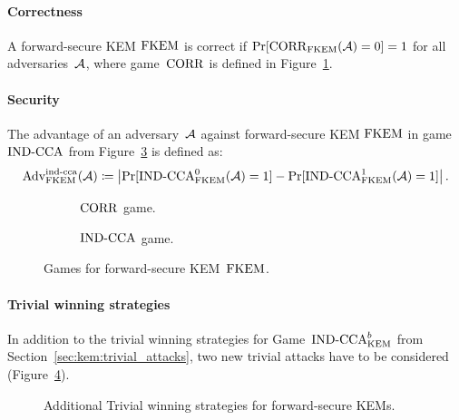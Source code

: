 \paragraph{Correctness} 
A forward-secure KEM $\mathrm{FKEM}$ is correct if $\Pr[\mathrm{CORR}_{\mathrm{FKEM}}(\mathcal{A})=0]=1$ for all adversaries~$\mathcal{A}$, where game~$\mathrm{CORR}$ is defined in Figure~\ref{fig:fkem:corr}.

\paragraph{Security}
The advantage of an adversary~$\mathcal{A}$ against forward-secure KEM $\mathrm{FKEM}$ in game ${\mathrm{IND}\text{-}\mathrm{CCA}}$ from Figure~\ref{fig:fkem:ind} is defined as:
\[
\mathrm{Adv}_{\mathrm{FKEM}}^{\mathrm{ind}\text{-}\mathrm{cca}}(\mathcal{A})\coloneqq\left|\Pr[{\mathrm{IND}\text{-}\mathrm{CCA}}_{\mathrm{FKEM}}^0(\mathcal{A})=1]-\Pr[{\mathrm{IND}\text{-}\mathrm{CCA}}_{\mathrm{FKEM}}^1(\mathcal{A})=1]\right|\text{.}
\]

\begin{figure}[!ht]
    \begin{subfigure}{.49\textwidth}
        \centering
        \nicoresetlinenr%
        \fbox{%
            \scalebox{\codescalefactor}{%
            }%
        }
        \caption{%
            $\mathrm{CORR}$ game.
        }
        \label{fig:fkem:corr}    
    \end{subfigure}
    \hfill
    \begin{subfigure}{.49\textwidth}
        \centering
        \nicoresetlinenr%
        \fbox{%
            \scalebox{\codescalefactor}{%
            }%
        }
        \caption{%
            ${\mathrm{IND}\text{-}\mathrm{CCA}}$ game.
        }
        \label{fig:fkem:ind}
    \end{subfigure}
    \caption{Games for forward-secure KEM~$\mathrm{FKEM}$.}
\end{figure}

\paragraph{Trivial winning strategies} In addition to the trivial winning strategies for Game~${\mathrm{IND}\text{-}\mathrm{CCA}}^b_{\mathrm{KEM}}$ from Section~\ref{sec:kem:trivial_attacks}, two new trivial attacks have to be considered (Figure~\ref{fig:fkem:triv}).

\begin{figure}[!ht]%
    \centering
    
    \caption{Additional Trivial winning strategies for forward-secure KEMs.}
    \label{fig:fkem:triv}
\end{figure}

